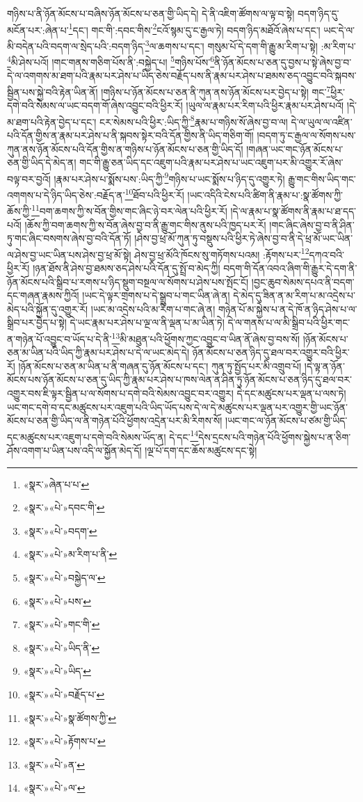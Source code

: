 གཉིས་པ་ནི་ཉོན་མོངས་པ་བཞིས་ཉོན་མོངས་པ་ཅན་གྱི་ཡིད་དེ། དེ་ནི་འཇིག་ཚོགས་ལ་ལྟ་བ་སྟེ། བདག་ཉིད་དུ་མངོན་པར་:ཞེན་པ་\footnote{«སྣར་»ཞེན་པ་པ་}དང་། གང་གི་:དབང་གིས་\footnote{«སྣར་»«པེ་»དབང་གི་}ངའོ་སྙམ་དུ་ང་རྒྱལ་ཏེ། བདག་ཉིད་མཐོའོ་ཞེས་པ་དང་། ཡང་དེ་ལ་མི་བདེན་པའི་བདག་ལ་སྲེད་པའི་:བདག་ཉིད་\footnote{«སྣར་»«པེ་»བདག་}ལ་ཆགས་པ་དང་། གསུམ་པོ་དེ་དག་གི་རྒྱུ་མ་རིག་པ་སྟེ། :མ་རིག་པ་\footnote{«སྣར་»«པེ་»མ་རིག་པ་ནི་}མི་ཤེས་པའོ། །གང་གནས་གཅིག་པོས་ནི་:བསྐྱེད་པ། \footnote{«སྣར་»«པེ་»བསྐྱེད་ལ་}གཉིས་པོས་\footnote{«སྣར་»«པེ་»པས་}ནི་ཉོན་མོངས་པ་ཅན་དུ་བྱས་པ་སྟེ་ཞེས་བྱ་བ་དེ་ལ་འགགས་མ་ཐག་པའི་རྣམ་པར་ཤེས་པ་ཡིད་ཅེས་བརྗོད་པས་ནི་རྣམ་པར་ཤེས་པ་ཐམས་ཅད་འབྱུང་བའི་སྐབས་སྦྱིན་པས་སྐྱེ་བའི་རྟེན་ཡིན་ནོ། །གཉིས་པ་ཉོན་མོངས་པ་ཅན་ནི་ཀུན་ནས་ཉོན་མོངས་པར་བྱེད་པ་སྟེ། གང་\footnote{«སྣར་»«པེ་»གང་གི་}ཕྱིར་དགེ་བའི་སེམས་ལ་ཡང་བདག་གོ་ཞེས་འབྱུང་བའི་ཕྱིར་རོ། །ཡུལ་ལ་རྣམ་པར་རིག་པའི་ཕྱིར་རྣམ་པར་ཤེས་པའོ། །དེ་མ་ཐག་པའི་རྟེན་བྱེད་པ་དང་། ངར་སེམས་པའི་ཕྱིར་:ཡིད་ཀྱི་\footnote{«སྣར་»«པེ་»ཡིད་ནི་}རྣམ་པ་གཉིས་སོ་ཞེས་བྱ་བ་ལ། དེ་ལ་ཡུལ་ལ་འཛིན་པའི་དོན་གྱིས་ན་རྣམ་པར་ཤེས་པ་ནི་སྐབས་སྟེར་བའི་དོན་གྱིས་ནི་ཡིད་གཅིག་གོ། །བདག་ཏུ་ང་རྒྱལ་ལ་སོགས་པས་ཀུན་ནས་ཉོན་མོངས་པའི་དོན་གྱིས་ན་གཉིས་པ་ཉོན་མོངས་པ་ཅན་གྱི་ཡིད་དོ། །གཞན་ཡང་གང་ཉོན་མོངས་པ་ཅན་གྱི་ཡིད་དེ་མེད་ན། གང་གི་རྒྱུ་ཅན་ཡིད་དང་འཇུག་པའི་རྣམ་པར་ཤེས་པ་ཡང་འཇུག་པར་མི་འགྱུར་རོ་ཞེས་བལྟ་བར་བྱའོ། །རྣམ་པར་ཤེས་པ་སྨོས་པས་:ཡིད་ཀྱི་\footnote{«སྣར་»«པེ་»ཡིད་}གཉིས་པ་ཡང་སྨོས་པ་ཉིད་དུ་འགྱུར་ཏེ། རྒྱུ་གང་གིས་ཡིད་གང་འགགས་པ་དེ་ཉིད་ཡིད་ཅེས་:བརྗོད་ན་\footnote{«སྣར་»«པེ་»བརྗོད་པ་}ཐོབ་པའི་ཕྱིར་རོ། །ཡང་འདིའི་ངེས་པའི་ཚིག་ནི་རྣམ་པ་:སྣ་ཚོགས་ཀྱི་ཆོས་ཀྱི་\footnote{«སྣར་»«པེ་»སྣ་ཚོགས་ཀྱི་}བག་ཆགས་ཀྱི་ས་བོན་གྱིས་གང་ཞིང་ཉེ་བར་ལེན་པའི་ཕྱིར་རོ། །དེ་ལ་རྣམ་པ་སྣ་ཚོགས་ནི་རྣམ་པ་ཐ་དད་པའོ། །ཆོས་ཀྱི་བག་ཆགས་ཀྱི་ས་བོན་ཞེས་བྱ་བ་ནི་རྒྱུ་གང་གིས་ནུས་པའི་ཁྱད་པར་རོ། །གང་ཞིང་ཞེས་བྱ་བ་ནི་ཤིན་ཏུ་གང་ཞིང་བསགས་ཞེས་བྱ་བའི་དོན་ཏོ། །ཤེས་བྱ་ཕྲ་མོ་ཀུན་ཏུ་བསྡུས་པའི་ཕྱིར་ཏེ་ཞེས་བྱ་བ་ནི་དེ་ཕྲ་མོ་ཡང་ཡིན་ལ་ཤེས་བྱ་ཡང་ཡིན་པས་ཤེས་བྱ་ཕྲ་མོ་སྟེ། ཤེས་བྱ་ཕྲ་མོའི་ཁོངས་སུ་གཏོགས་པའམ། :རྟོགས་པར་\footnote{«སྣར་»«པེ་»རྟོགས་པ་}དཀའ་བའི་ཕྱིར་རོ། །ཉན་ཐོས་ནི་ཤེས་བྱ་ཐམས་ཅད་ཤེས་པའི་དོན་དུ་སྤྲོ་བ་མེད་ཀྱི། བདག་གི་དོན་འབའ་ཞིག་གི་རྒྱུར་དེ་དག་ནི་ཉོན་མོངས་པའི་སྒྲིབ་པ་རགས་པ་ཉིད་སྡུག་བསྔལ་ལ་སོགས་པ་ཤེས་པས་སྤོང་ངོ། །བྱང་ཆུབ་སེམས་དཔའ་ནི་བདག་དང་གཞན་རྣམས་ཀྱིའོ། །ཡང་དེ་ལྟར་གྲགས་པ་དེ་སྒྲུབ་པ་གང་ཡིན་ཞེ་ན། དེ་མེད་དུ་ཟིན་ན་མ་རིག་པ་མ་འདྲེས་པ་མེད་པའི་སྐྱོན་དུ་འགྱུར་རོ། །ཡང་མ་འདྲེས་པའི་མ་རིག་པ་གང་ཞེ་ན། གཉེན་པོ་མ་སྐྱེས་པ་ན་དེ་ཁོ་ན་ཉིད་ཤེས་པ་ལ་སྒྲིབ་པར་བྱེད་པ་སྟེ། དེ་ཡང་རྣམ་པར་ཤེས་པ་ལྔ་ལ་ནི་ལྡན་པ་མ་ཡིན་ཏེ། དེ་ལ་གནས་པ་ལ་མི་སྒྲིབ་པའི་ཕྱིར་གང་ན་གཉེན་པོ་འབྱུང་བ་ཡོད་པ་དེ་ནི་\footnote{«སྣར་»«པེ་»ན་}མི་མཐུན་པའི་ཕྱོགས་ཀྱང་འབྱུང་བ་ཡིན་ནོ་ཞེས་བྱ་བས་སོ། །ཉོན་མོངས་པ་ཅན་མ་ཡིན་པའི་ཡིད་ཀྱི་རྣམ་པར་ཤེས་པ་དེ་ལ་ཡང་མེད་དེ། ཉོན་མོངས་པ་ཅན་ཉིད་དུ་ཐལ་བར་འགྱུར་བའི་ཕྱིར་རོ། །ཉོན་མོངས་པ་ཅན་མ་ཡིན་པ་ནི་གཞན་དུ་ཉོན་མོངས་པ་དང་། ཀུན་ཏུ་སྤྱོད་པར་མི་འགྲུབ་པོ། །དེ་ལྟ་ན་ཉོན་མོངས་པས་ཉོན་མོངས་པ་ཅན་དུ་ཡིད་ཀྱི་རྣམ་པར་ཤེས་པ་ཁས་ལེན་ན་ཤིན་ཏུ་ཉོན་མོངས་པ་ཅན་ཉིད་དུ་ཐལ་བར་འགྱུར་བས་ཇི་ལྟར་སྦྱིན་པ་ལ་སོགས་པ་དགེ་བའི་སེམས་འབྱུང་བར་འགྱུར། དེ་དང་མཚུངས་པར་ལྡན་པ་ལས་ཏེ། ཡང་གང་དགེ་བ་དང་མཚུངས་པར་འཇུག་པའི་ཡིད་ཡོད་པས་དེ་ལ་དེ་མཚུངས་པར་ལྡན་པར་འགྱུར་གྱི་ཡང་ཉོན་མོངས་པ་ཅན་གྱི་ཡིད་ལ་ནི་གཉེན་པོའི་ཕྱོགས་འདྲེན་པར་མི་རིགས་སོ། །ཡང་གང་ལ་ཉོན་མོངས་པ་ཙམ་གྱི་ཡིད་དང་མཚུངས་པར་འཇུག་པ་དགེ་བའི་སེམས་ཡོད་ན། དེ་དང་\footnote{«སྣར་»«པེ་»ལ་}དེས་དྲངས་པའི་གཉེན་པོའི་ཕྱོགས་སྐྱེས་པ་ན་ཅིག་ཤོས་འགག་པ་ཡིན་པས་འདི་ལ་སྐྱོན་མེད་དོ། །ལྔ་པོ་དག་དང་ཆོས་མཚུངས་དང་སྟེ། 